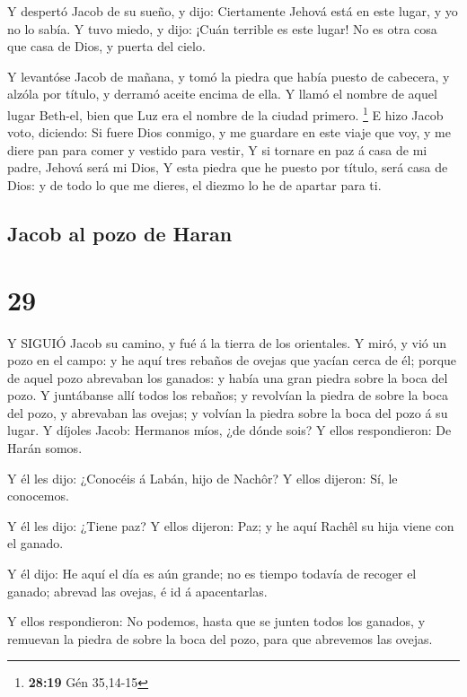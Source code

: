  Y despertó Jacob de su sueño, y dijo: Ciertamente Jehová
está en este lugar, y yo no lo sabía.  Y tuvo miedo, y
dijo: ¡Cuán terrible es este lugar! No es otra cosa que casa de Dios, y
puerta del cielo.

 Y levantóse Jacob de mañana, y tomó la piedra que había
puesto de cabecera, y alzóla por título, y derramó aceite encima de
ella.  Y llamó el nombre de aquel lugar Beth-el, bien que
Luz era el nombre de la ciudad primero. \footnote{\textbf{28:19} Gén
  35,14-15}  E hizo Jacob voto, diciendo: Si fuere Dios
conmigo, y me guardare en este viaje que voy, y me diere pan para comer
y vestido para vestir,  Y si tornare en paz á casa de mi
padre, Jehová será mi Dios,  Y esta piedra que he puesto
por título, será casa de Dios: y de todo lo que me dieres, el diezmo lo
he de apartar para ti.

\hypertarget{jacob-al-pozo-de-haran}{%
\subsection{Jacob al pozo de Haran}\label{jacob-al-pozo-de-haran}}

\hypertarget{section-28}{%
\section{29}\label{section-28}}

 Y SIGUIÓ Jacob su camino, y fué á la tierra de los
orientales.  Y miró, y vió un pozo en el campo: y he aquí
tres rebaños de ovejas que yacían cerca de él; porque de aquel pozo
abrevaban los ganados: y había una gran piedra sobre la boca del pozo.
 Y juntábanse allí todos los rebaños; y revolvían la piedra
de sobre la boca del pozo, y abrevaban las ovejas; y volvían la piedra
sobre la boca del pozo á su lugar.  Y díjoles Jacob:
Hermanos míos, ¿de dónde sois? Y ellos respondieron: De Harán somos.

 Y él les dijo: ¿Conocéis á Labán, hijo de Nachôr? Y ellos
dijeron: Sí, le conocemos.

 Y él les dijo: ¿Tiene paz? Y ellos dijeron: Paz; y he aquí
Rachêl su hija viene con el ganado.

 Y él dijo: He aquí el día es aún grande; no es tiempo
todavía de recoger el ganado; abrevad las ovejas, é id á apacentarlas.

 Y ellos respondieron: No podemos, hasta que se junten todos
los ganados, y remuevan la piedra de sobre la boca del pozo, para que
abrevemos las ovejas.

